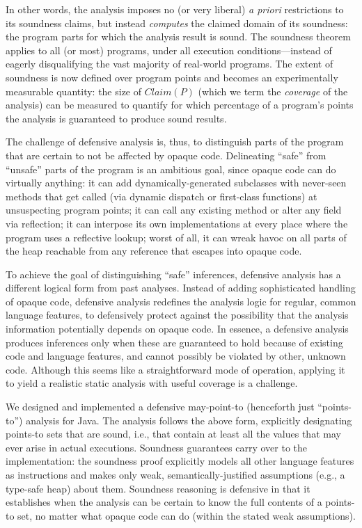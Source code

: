 In other words, the analysis imposes no (or very liberal) \emph{a priori} restrictions to its soundness claims, but instead \emph{computes} the claimed domain of its soundness: the program parts for which the analysis result is sound. The soundness theorem applies to all (or most) programs, under all execution conditions---instead of eagerly disqualifying the vast majority of real-world programs. The extent of soundness is now defined over program points and becomes an experimentally measurable quantity: the size of $Claim(P)$ (which we term the \emph{coverage} of the analysis) can be measured to quantify for which percentage of a program's points the analysis is guaranteed to produce sound results.

The challenge of defensive analysis is, thus, to distinguish parts of the program that are certain to not be affected by opaque code. Delineating ``safe'' from ``unsafe'' parts of the program is an ambitious goal, since opaque code can do virtually anything: it can add dynamically-generated subclasses with never-seen methods that get called (via dynamic dispatch or first-class functions) at unsuspecting program points; it can call any existing method or alter any field via reflection; it can interpose its own implementations at every place where the program uses a reflective lookup; worst of all, it can wreak havoc on all parts of the heap reachable from any reference that escapes into opaque code.

To achieve the goal of distinguishing ``safe'' inferences, defensive analysis has a different logical form from past analyses. Instead of adding sophisticated handling of opaque code, defensive analysis redefines the analysis logic for regular, common language features, to defensively protect against the possibility that the analysis information potentially depends on opaque code. In essence, a defensive analysis produces inferences only when these are guaranteed to hold because of existing code and language features, and cannot possibly be violated by other, unknown code. Although this seems like a straightforward mode of operation, applying it to yield a realistic static analysis with useful coverage is a challenge.

We designed and implemented a defensive may-point-to (henceforth just ``points-to'') analysis for Java. The analysis follows the above form, explicitly designating points-to sets that are sound, i.e., that contain at least all the values that may ever arise in actual executions. Soundness guarantees carry over to the implementation: the soundness proof explicitly models all other language features as \unknown{} instructions and makes only weak, semantically-justified assumptions (e.g., a type-safe heap) about them. Soundness reasoning is defensive in that it establishes when the analysis can be certain to know the full contents of a points-to set, no matter what opaque code can do (within the stated weak assumptions).

